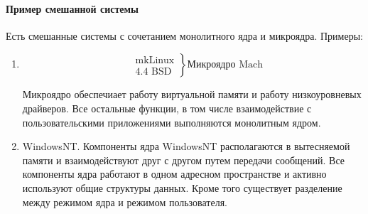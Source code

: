 \paragraph{Пример смешанной системы}\mbox{}\par
Есть смешанные системы с сочетанием монолитного ядра и микроядра. Примеры:
\begin{enumerate}
  \item 
    \[
      \left.\begin{aligned} 
          &\text{mkLinux} \\ &\text{4.4 BSD}
      \end{aligned}\right\} \text{Микроядро Mach} 
    \] \par
    Микроядро обеспечиает работу виртуальной памяти и работу низкоуровневых
    драйверов. Все остальные функции, в том числе взаимодействие с пользовательскими
    приложениями выполняются монолитным ядром.
  \item WindowsNT. Компоненты ядра WindowsNT располагаются в вытесняемой памяти
    и взаимодействуют друг с другом путем передачи сообщений. Все компоненты
    ядра работают в одном адресном пространстве и активно используют общие
    структуры данных. Кроме того существует разделение между режимом ядра и
    режимом пользователя.
\end{enumerate}

